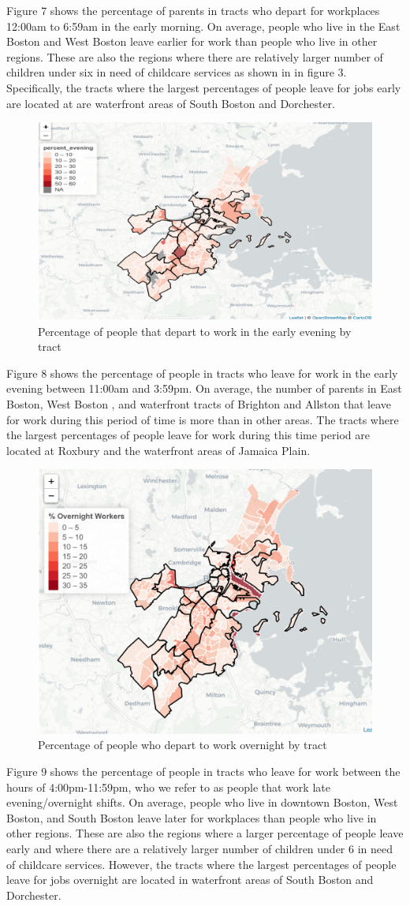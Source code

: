 \documentclass[10pt,letterpaper]{article}
\begin{document}
Figure 7 shows the percentage of parents in tracts who depart for
workplaces 12:00am to 6:59am in the early morning. On average, people
who live in the East Boston and West Boston leave earlier for work than
people who live in other regions. These are also the regions where there
are relatively larger number of children under six in need of childcare
services as shown in in figure 3. Specifically, the tracts where the
largest percentages of people leave for jobs early are located at are
waterfront areas of South Boston and Dorchester.

\begin{figure}

{\centering \includegraphics[width=0.25\linewidth]{fig5} 

}

\caption{Percentage of people that depart to work in the early evening by tract}\label{fig:unnamed-chunk-8}
\end{figure}

Figure 8 shows the percentage of people in tracts who leave for work in
the early evening between 11:00am and 3:59pm. On average, the number of
parents in East Boston, West Boston , and waterfront tracts of Brighton
and Allston that leave for work during this period of time is more than
in other areas. The tracts where the largest percentages of people leave
for work during this time period are located at Roxbury and the
waterfront areas of Jamaica Plain.

\begin{figure}

{\centering \includegraphics[width=0.25\linewidth]{fig6_percent_overnight} 

}

\caption{Percentage of people who depart to work overnight by tract}\label{fig:unnamed-chunk-9}
\end{figure}

Figure 9 shows the percentage of people in tracts who leave for work
between the hours of 4:00pm-11:59pm, who we refer to as people that work
late evening/overnight shifts. On average, people who live in downtown
Boston, West Boston, and South Boston leave later for workplaces than
people who live in other regions. These are also the regions where a
larger percentage of people leave early and where there are a relatively
larger number of children under 6 in need of childcare services.
However, the tracts where the largest percentages of people leave for
jobs overnight are located in waterfront areas of South Boston and
Dorchester.
\end{document}
